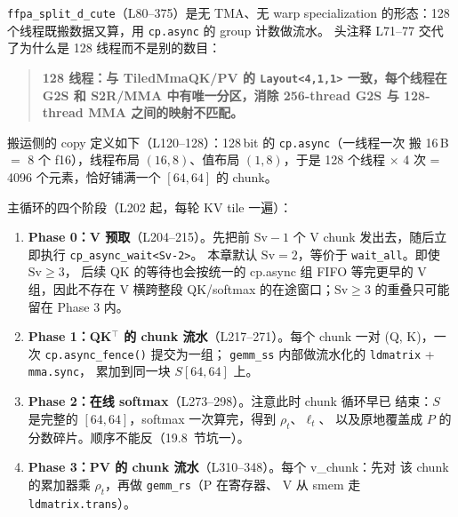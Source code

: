 \texttt{ffpa\_\allowbreak{}split\_\allowbreak{}d\_\allowbreak{}cute}（L80--375）是无 TMA、无 warp specialization
的形态：128 个线程既搬数据又算，用 \texttt{cp.async} 的 group 计数做流水。
头注释 L71--77 交代了为什么是 128 线程而不是别的数目：

\begin{quote}\small
\textbf{128 线程：与 TiledMmaQK/PV 的 \texttt{Layout\allowbreak{}<4,\allowbreak{}1,\allowbreak{}1>} 一致，每个线程在 G2S 和
S2R/MMA 中有唯一分区，消除 256-thread G2S 与 128-thread MMA 之间的映射不匹配。}
\end{quote}

搬运侧的 copy 定义如下（L120--128）：128\,bit 的 \texttt{cp.async}（一线程一次
搬 16\,B $=$ 8 个 f16），线程布局 $(16,8)$、值布局 $(1,8)$，于是 128 个线程
$\times$ 4 次 = 4096 个元素，恰好铺满一个 $[64,64]$ 的 chunk。



主循环的四个阶段（L202 起，每轮 KV tile 一遍）：

\begin{enumerate}[itemsep=2pt,topsep=2pt]
  \item \textbf{Phase 0：V 预取}（L204--215）。先把前 $\mathrm{Sv}-1$ 个 V chunk
        发出去，随后立即执行 \texttt{cp\_\allowbreak{}async\_\allowbreak{}wait<Sv-2>}。
        本章默认 $\mathrm{Sv}=2$，等价于 \texttt{wait\_all}。即使 $\mathrm{Sv}\ge3$，
        后续 QK 的等待也会按统一的 cp.async 组 FIFO 等完更早的 V 组，因此不存在
        V 横跨整段 QK/softmax 的在途窗口；$\mathrm{Sv}\ge3$ 的重叠只可能留在 Phase 3 内。
  \item \textbf{Phase 1：QK${}^\top$ 的 chunk 流水}（L217--271）。每个 chunk
        一对 (Q, K)，一次 \texttt{cp.\allowbreak{}async\_\allowbreak{}fence\allowbreak{}()} 提交为一组；
        \texttt{gemm\_ss} 内部做流水化的 \texttt{ldmatrix} + \texttt{mma.sync}，
        累加到同一块 $S[64,64]$ 上。
  \item \textbf{Phase 2：在线 softmax}（L273--298）。注意此时 chunk 循环早已
        结束：$S$ 是完整的 $[64,64]$，softmax 一次算完，得到 $\rho_t$、$\ell_t$、
        以及原地覆盖成 $P$ 的分数碎片。顺序不能反（19.8~节坑一）。
  \item \textbf{Phase 3：PV 的 chunk 流水}（L310--348）。每个 v\_chunk：先对
        该 chunk 的累加器乘 $\rho_t$，再做 \texttt{gemm\_rs}（P 在寄存器、
        V 从 smem 走 \texttt{ldmatrix.\allowbreak{}trans}）。
\end{enumerate}

